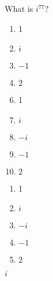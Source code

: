 





 What is $i^{77}$?


\ifsat
	\begin{enumerate}[label=\Alph*)]
		\item   1
		\item  $i$%
		\item  $-1$
		\item  $2$
	\end{enumerate}
\else
\fi

\ifacteven
	\begin{enumerate}[label=\textbf{\Alph*.},itemsep=\fill,align=left]
		\setcounter{enumii}{5}
		\item   1
		\item  $i$%
		\item  $-i$
		\addtocounter{enumii}{1}
		\item  $-1$
		\item  $2$
	\end{enumerate}
\else
\fi

\ifactodd
	\begin{enumerate}[label=\textbf{\Alph*.},itemsep=\fill,align=left]
		\item   1
		\item  $i$%
		\item  $-i$
		\item  $-1$
		\item  $2$
	\end{enumerate}
\else
\fi

\ifgridin
  $i$%
		
\else
\fi

